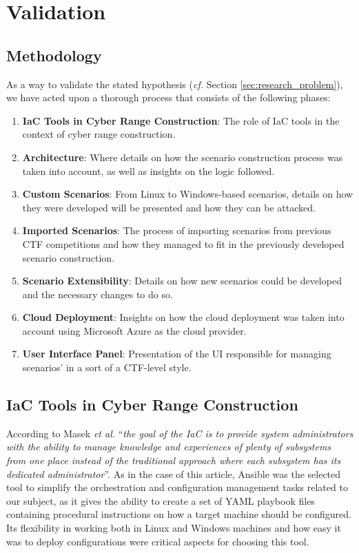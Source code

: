 \chapter{Validation}\label{chap:validation}

\minitoc

\section{Methodology} \label{sec:validation_methodology}

As a way to validate the stated hypothesis (\textit{cf.} Section \ref{sec:research_problem}), we have acted upon a thorough process that consists of the following phases:

\begin{enumerate}
    \item \textbf{IaC Tools in Cyber Range Construction}: The role of IaC tools in the context of cyber range construction. %
    \item \textbf{Architecture}: Where details on how the scenario construction process was taken into account, as well as insights on the logic followed.%
    \item \textbf{Custom Scenarios}: From Linux to Windows-based scenarios, details on how they were developed will be presented and how they can be attacked.
    \item \textbf{Imported Scenarios}: The process of importing scenarios from previous CTF competitions and how they managed to fit in the previously developed scenario construction.
    \item \textbf{Scenario Extensibility}: Details on how new scenarios could be developed and the necessary changes to do so.
    \item \textbf{Cloud Deployment}: Insights on how the cloud deployment was taken into account using Microsoft Azure as the cloud provider.
    \item \textbf{User Interface Panel}: Presentation of the UI responsible for managing scenarios' in a sort of a CTF-level style.
\end{enumerate}


\section{IaC Tools in Cyber Range Construction} \label{sec:validation_iac_tools_in_cr_construction}

According to Masek \textit{et al.} \cite{unleashing_full_potential_of_ansible_ref} ``\textit{the goal of the IaC is to provide system administrators with the ability to manage knowledge and experiences of plenty of subsystems from one place instead of the traditional approach where each subsystem has its dedicated administrator}''. As in the case of this article, Ansible was the selected tool to simplify the orchestration and configuration management tasks related to our subject, as it gives the ability to create a set of YAML playbook files containing procedural instructions on how a target machine should be configured. Its flexibility in working both in Linux and Windows machines and how easy it was to deploy configurations were critical aspects for choosing this tool. 

